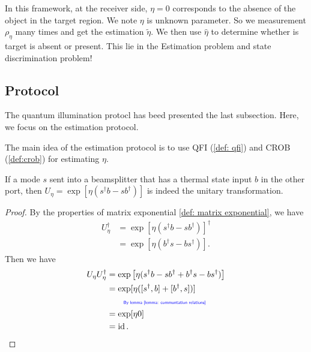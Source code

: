 \documentclass[../../note.tex]{subfiles}
\begin{document}
In this framework, at the receiver side, $\eta=0$ corresponds to the absence of the object in the target region. We note $\eta$ is unknown parameter. So we measurement $\rho_{\eta}$ many times and get the estimation $\tilde{\eta}$. We then use $\hat{\eta}$ to determine whether is target is absent or present. This lie in the Estimation problem and state discrimination problem!

\subsection{Protocol}
The quantum illumination protocl has beed presented the last subsection. Here, we focus on the estimation protocol.

The main idea of the estimation protocol is to use QFI (\ref{def: qfi}) and CROB (\ref{def:crob}) for estimating $\eta$.

\begin{lemma}
    If a mode $s$ sent into a beamsplitter that has a thermal state input $b$ in the other port, then $U_{\eta} = \exp[\eta(s^\dagger b - s b^\dagger)]$ is indeed the unitary transformation.
    \label{lemma: unitary transformation}
\end{lemma}
\begin{proof}
    By the properties of matrix exponential \ref{def: matrix exponential}, we have
    \begin{align}
        U_{\eta}^{\dagger}
        &= \exp[\eta(s^\dagger b - s b^\dagger)]^\dagger \\
        &= \exp[\eta(b^\dagger s - b s^\dagger)].
    \end{align}
    Then we have
    \begin{align}
        U_{\eta} U_{\eta}^\dagger
        &= \exp\left[\eta(s^\dagger b - s b^\dagger + b^\dagger s - b s^\dagger)\right] \\
        &= \exp[\eta([s^\dagger, b] + [b^\dagger, s])] \\
        &\qquad\text{\color{blue}{\tiny\sffamily By lemma \ref{lemma: communtation relations}}} \nonumber \\
        &= \exp[\eta 0] \\
        &= \operatorname{id}.
    \end{align}
\end{proof}
\end{document}
